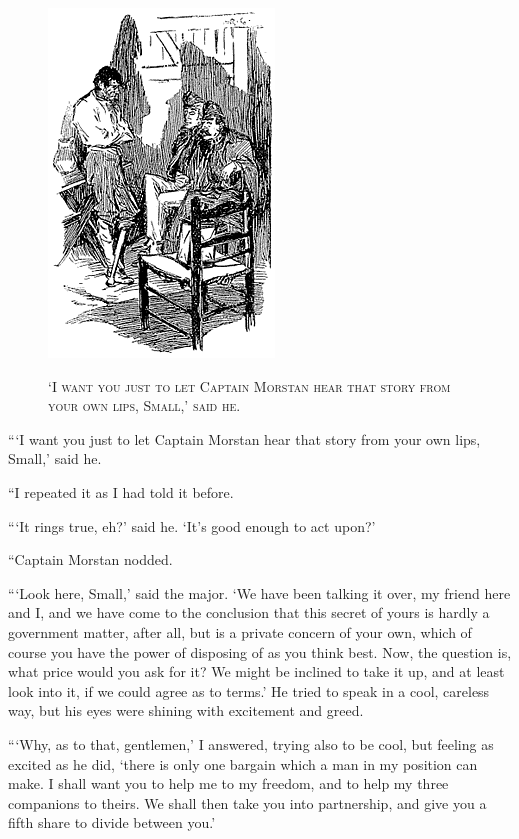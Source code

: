 \documentclass[12pt,english,oneside]{book}
\newcommand{\noun}[1]{\textsc{#1}}
\begin{document}
%
\begin{figure}[htbp]
\noindent \begin{center}\includegraphics{images/sign410-sign-23.png}\end{center}

\noindent \begin{center}\noun{`I want you just to let Captain Morstan
hear that story from your own lips, Small,' said he.}\end{center}
\end{figure}
{}```I want you just to let Captain Morstan hear that story from
your own lips, Small,' said he.

{}``I repeated it as I had told it before.

{}```It rings true, eh?' said he. `It's good enough to act upon?'

{}``Captain Morstan nodded.

{}```Look here, Small,' said the major. `We have been talking it
over, my friend here and I, and we have come to the conclusion that
this secret of yours is hardly a government matter, after all, but
is a private concern of your own, which of course you have the power
of disposing of as you think best. Now, the question is, what price
would you ask for it? We might be inclined to take it up, and at least
look into it, if we could agree as to terms.' He tried to speak in
a cool, careless way, but his eyes were shining with excitement and
greed.

{}```Why, as to that, gentlemen,' I answered, trying also to be cool,
but feeling as excited as he did, `there is only one bargain which
a man in my position can make. I shall want you to help me to my freedom,
and to help my three companions to theirs. We shall then take you
into partnership, and give you a fifth share to divide between you.'
\end{document}
